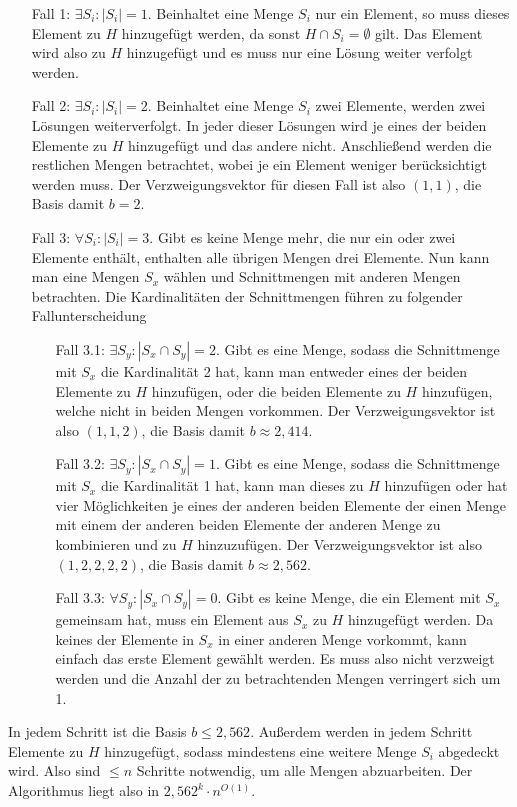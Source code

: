 \begin{itemize}
\item[Fall 1:]$\exists S_i: |S_i|=1$. Beinhaltet eine Menge $S_i$ nur ein Element, so muss dieses Element zu $H$ hinzugefügt werden, da sonst $H \cap S_i = \emptyset$ gilt. Das Element wird also zu $H$ hinzugefügt und es muss nur eine Lösung weiter verfolgt werden.

\item[Fall 2:]$\exists S_i: |S_i|=2$. Beinhaltet eine Menge $S_i$ zwei Elemente, werden zwei Lösungen weiterverfolgt. In jeder dieser Lösungen wird je eines der beiden Elemente zu $H$ hinzugefügt und das andere nicht. Anschließend werden die restlichen Mengen betrachtet, wobei je ein Element weniger berücksichtigt werden muss. Der Verzweigungsvektor für diesen Fall ist also $(1,1)$, die Basis damit $b=2$.

\item[Fall 3:]$\forall S_i: |S_i|=3$. Gibt es keine Menge mehr, die nur ein oder zwei Elemente enthält, enthalten alle übrigen Mengen drei Elemente. Nun kann man eine Mengen $S_x$ wählen und Schnittmengen mit anderen Mengen betrachten. Die Kardinalitäten der Schnittmengen führen zu folgender Fallunterscheidung

\begin{itemize}
\item[Fall 3.1:]$\exists S_y: |S_x \cap S_y| = 2$. Gibt es eine Menge, sodass die Schnittmenge mit $S_x$ die Kardinalität 2 hat, kann man entweder eines der beiden Elemente zu $H$ hinzufügen, oder die beiden Elemente zu $H$ hinzufügen, welche nicht in beiden Mengen vorkommen. Der Verzweigungsvektor ist also $(1,1,2)$, die Basis damit $b\approx 2,414$.

\item[Fall 3.2:]$\exists S_y: |S_x \cap S_y| = 1$. Gibt es eine Menge, sodass die Schnittmenge mit $S_x$ die Kardinalität 1 hat, kann man dieses zu $H$ hinzufügen oder hat vier Möglichkeiten je eines der anderen beiden Elemente der einen Menge mit einem der anderen beiden Elemente der anderen Menge zu kombinieren und zu $H$ hinzuzufügen. Der Verzweigungsvektor ist also $(1,2,2,2,2)$, die Basis damit $b\approx 2,562$.

\item[Fall 3.3:]$\forall S_y: |S_x \cap S_y| = 0$. Gibt es keine Menge, die ein Element mit $S_x$ gemeinsam hat, muss ein Element aus $S_x$ zu $H$ hinzugefügt werden. Da keines der Elemente in $S_x$ in einer anderen Menge vorkommt, kann einfach das erste Element gewählt werden. Es muss also nicht verzweigt werden und die Anzahl der zu betrachtenden Mengen verringert sich um 1.
\end{itemize}
\end{itemize}

In jedem Schritt ist die Basis $b \leq 2,562$. Außerdem werden in jedem Schritt Elemente zu $H$ hinzugefügt, sodass mindestens eine weitere Menge $S_i$ abgedeckt wird. Also sind $\leq n$ Schritte notwendig, um alle Mengen abzuarbeiten. Der Algorithmus liegt also in $2,562^k \cdot n^{O(1)}$.




